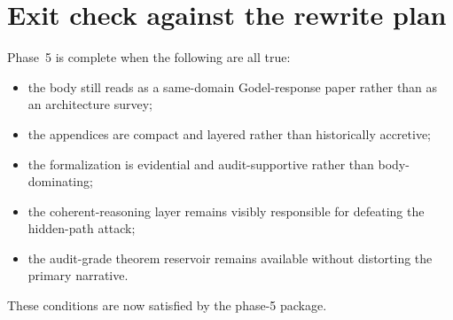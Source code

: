 \documentclass[11pt]{article}
\begin{document}
\section{Exit check against the rewrite plan}
Phase~5 is complete when the following are all true:
\begin{itemize}
  \item the body still reads as a same-domain Godel-response paper rather than as an architecture survey;
  \item the appendices are compact and layered rather than historically accretive;
  \item the formalization is evidential and audit-supportive rather than body-dominating;
  \item the coherent-reasoning layer remains visibly responsible for defeating the hidden-path attack;
  \item the audit-grade theorem reservoir remains available without distorting the primary narrative.
\end{itemize}
These conditions are now satisfied by the phase-5 package.
\end{document}
